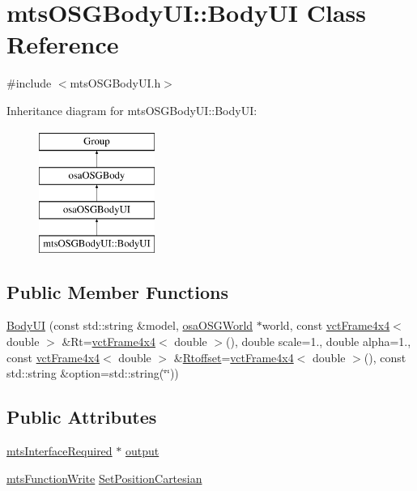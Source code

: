 \hypertarget{classmts_o_s_g_body_u_i_1_1_body_u_i}{}\section{mts\+O\+S\+G\+Body\+U\+I\+:\+:Body\+U\+I Class Reference}
\label{classmts_o_s_g_body_u_i_1_1_body_u_i}


{\ttfamily \#include $<$mts\+O\+S\+G\+Body\+U\+I.\+h$>$}

Inheritance diagram for mts\+O\+S\+G\+Body\+U\+I\+:\+:Body\+U\+I\+:\begin{figure}[H]
\begin{center}
\leavevmode
\includegraphics[height=4.000000cm]{de/d40/classmts_o_s_g_body_u_i_1_1_body_u_i}
\end{center}
\end{figure}
\subsection*{Public Member Functions}
\begin{DoxyCompactItemize}
\item 
\hyperlink{classmts_o_s_g_body_u_i_1_1_body_u_i_a6187120fd48eadf45655cf830edb380e}{Body\+U\+I} (const std\+::string \&model, \hyperlink{classosa_o_s_g_world}{osa\+O\+S\+G\+World} $\ast$world, const \hyperlink{classvct_frame4x4}{vct\+Frame4x4}$<$ double $>$ \&Rt=\hyperlink{classvct_frame4x4}{vct\+Frame4x4}$<$ double $>$(), double scale=1., double alpha=1., const \hyperlink{classvct_frame4x4}{vct\+Frame4x4}$<$ double $>$ \&\hyperlink{classosa_o_s_g_body_ad008984bdb0eda300948932eda13974a}{Rtoffset}=\hyperlink{classvct_frame4x4}{vct\+Frame4x4}$<$ double $>$(), const std\+::string \&option=std\+::string(\char`\"{}\char`\"{}))
\end{DoxyCompactItemize}
\subsection*{Public Attributes}
\begin{DoxyCompactItemize}
\item 
\hyperlink{classmts_interface_required}{mts\+Interface\+Required} $\ast$ \hyperlink{classmts_o_s_g_body_u_i_1_1_body_u_i_a6f097314200b0f73b3fd377c7d4a2ed4}{output}
\item 
\hyperlink{classmts_function_write}{mts\+Function\+Write} \hyperlink{classmts_o_s_g_body_u_i_1_1_body_u_i_a60f80540e054d34498cfc08945cd512e}{Set\+Position\+Cartesian}
\end{DoxyCompactItemize}
